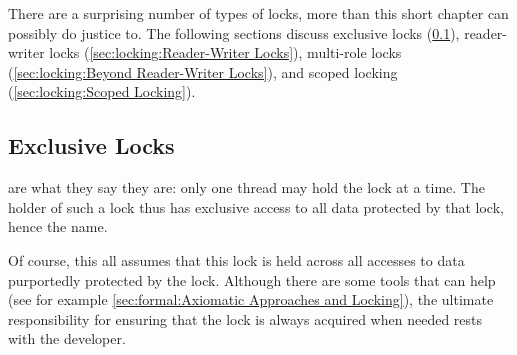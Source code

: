 There are a surprising number of types of locks, more than this
short chapter can possibly do justice to.
The following sections discuss
exclusive locks (\cref{sec:locking:Exclusive Locks}),
reader-writer locks (\cref{sec:locking:Reader-Writer Locks}),
multi-role locks (\cref{sec:locking:Beyond Reader-Writer Locks}),
and scoped locking (\cref{sec:locking:Scoped Locking}).

\subsection{Exclusive Locks}
\label{sec:locking:Exclusive Locks}

 are what they say they are: only one thread may hold
the lock at a time.
The holder of such a lock thus has exclusive access to all data protected
by that lock, hence the name.

Of course, this all assumes that this lock is held across all accesses
to data purportedly protected by the lock.
Although there are some tools that can help (see for example
\cref{sec:formal:Axiomatic Approaches and Locking}),
the ultimate responsibility for ensuring that the lock is always acquired
when needed rests with the developer.

